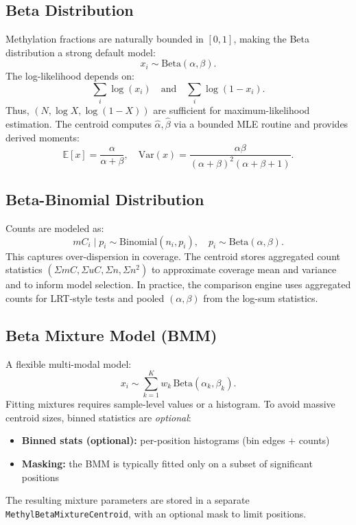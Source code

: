\documentclass[11pt]{article}
\begin{document}
\subsection{Beta Distribution}
Methylation fractions are naturally bounded in $[0,1]$, making the Beta
distribution a strong default model:
\[
  x_i \sim \mathrm{Beta}(\alpha, \beta)
.\]
The log-likelihood depends on:
\[
  \sum_i \log(x_i) \quad \text{and} \quad \sum_i \log(1-x_i)
.\]
Thus, $(N, \log X, \log(1-X))$ are sufficient for maximum-likelihood estimation.
The centroid computes $\hat{\alpha}, \hat{\beta}$ via a bounded MLE routine and
provides derived moments:
\[
  \mathbb{E}[x] = \frac{\alpha}{\alpha+\beta}, \quad
  \mathrm{Var}(x) = \frac{\alpha\beta}{(\alpha+\beta)^2(\alpha+\beta+1)}
.\]

\subsection{Beta-Binomial Distribution}
Counts are modeled as:
\[
  mC_i \mid p_i \sim \mathrm{Binomial}(n_i, p_i), \quad
  p_i \sim \mathrm{Beta}(\alpha, \beta)
.\]
This captures over-dispersion in coverage.
The centroid stores aggregated count statistics $(\Sigma mC, \Sigma uC, \Sigma n, \Sigma n^2)$
to approximate coverage mean and variance and to inform model selection.
In practice, the comparison engine uses aggregated counts for LRT-style tests and
pooled $(\alpha,\beta)$ from the log-sum statistics.

\subsection{Beta Mixture Model (BMM)}
A flexible multi-modal model:
\[
  x_i \sim \sum_{k=1}^K w_k \, \mathrm{Beta}(\alpha_k, \beta_k)
.\]
Fitting mixtures requires sample-level values or a histogram. To avoid massive
centroid sizes, binned statistics are \emph{optional}:
\begin{itemize}
  \item \textbf{Binned stats (optional):} per-position histograms (bin edges + counts)
  \item \textbf{Masking:} the BMM is typically fitted only on a subset of significant positions
\end{itemize}
The resulting mixture parameters are stored in a separate
\texttt{MethylBetaMixtureCentroid}, with an optional mask to limit positions.
\end{document}
